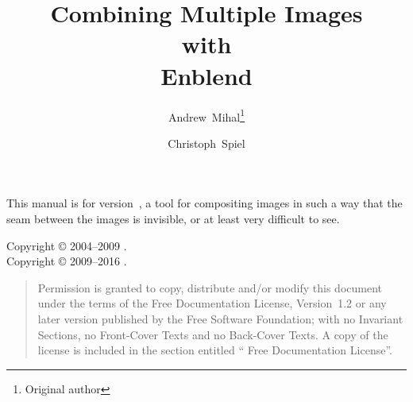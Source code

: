 

\begin{titlepage}
  \renewcommand{\thefootnote}{\fnsymbol{footnote}}

  \author{Andrew~Mihal\footnote{Original author} \and Christoph~Spiel}

  \title{Combining Multiple Images\\ with\\ Enblend }

  \date{}

  \maketitle
\end{titlepage}


\vspace*{\fill}
\ifhevea
  \relax
\else
  \begin{center}\end{center}
\fi

\label{sec:abstract}\noindent
This manual is for \App{} version~, a tool for compositing images in such a way
that the seam between the images is invisible, or at least very difficult to see.

\vspace*{\fill}

\begin{flushleft}
  Copyright \copyright{} 2004--2009 . \\
  Copyright \copyright{} 2009--2016 .
\end{flushleft}

\begin{quotation}
  \noindent Permission is granted to copy, distribute and/or modify this document under the
  terms of the  Free Documentation License, Version~1.2 or any later version
  published by the Free Software Foundation; with no Invariant Sections, no Front-Cover Texts
  and no Back-Cover Texts.  A copy of the license is included in the section entitled
  `` Free Documentation License''.
\end{quotation}

\cleardoublepage{}


